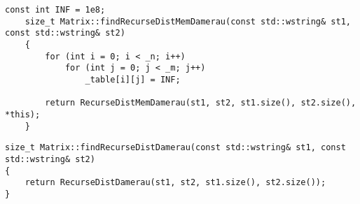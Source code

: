 \begin{lstlisting}[label=lst:damer_rec_mem_meth, caption=Метод нахождения расстояния Дамерау---Левенштейна с использованием функции \ref{lst:damer_rec_mem}]
    const int INF = 1e8;
    size_t Matrix::findRecurseDistMemDamerau(const std::wstring& st1, const std::wstring& st2)
    {
        for (int i = 0; i < _n; i++)
            for (int j = 0; j < _m; j++)
                _table[i][j] = INF;
        
        return RecurseDistMemDamerau(st1, st2, st1.size(), st2.size(), *this);
    }
\end{lstlisting}

\begin{lstlisting}[label=lst:damer_rec_meth, caption=Метод нахождения расстояния Дамерау---Левенштейна с использованием функции \ref{lst:damer_rec}]
size_t Matrix::findRecurseDistDamerau(const std::wstring& st1, const std::wstring& st2)
{
	return RecurseDistDamerau(st1, st2, st1.size(), st2.size());
}
\end{lstlisting}


